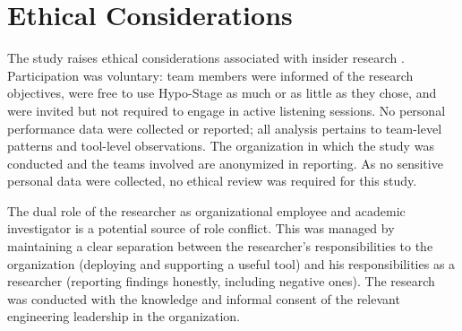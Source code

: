 \section{Ethical Considerations}
\label{sec:ethical-considerations}

The study raises ethical considerations associated with insider research \citep{robson2016}. Participation was voluntary: team members were informed of the research objectives, were free to use Hypo-Stage as much or as little as they chose, 
and were invited but not required to engage in active listening sessions. No personal performance data were collected or reported; all analysis
pertains to team-level patterns and tool-level observations. The organization in which the study was conducted and the teams involved are anonymized in reporting.
As no sensitive personal data were collected, no ethical review was required for this study.

The dual role of the researcher as organizational employee and academic investigator is a potential source of role conflict. This was managed by maintaining a clear
separation between the researcher's responsibilities to the organization (deploying and supporting a useful tool) and his responsibilities as a researcher (reporting
findings honestly, including negative ones). The research was conducted with the knowledge and informal consent of the relevant engineering leadership in the organization.
